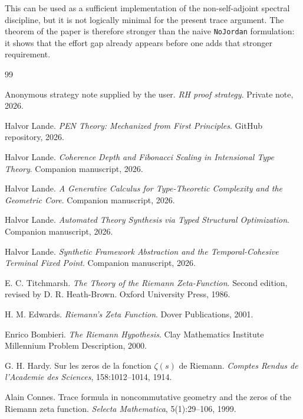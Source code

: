 \documentclass[11pt,a4paper]{article}
\theoremstyle{plain}
\theoremstyle{definition}
\theoremstyle{remark}
\begin{document}
This can be used as a sufficient implementation of the non-self-adjoint spectral discipline, but it is not logically minimal for the present trace argument. The theorem of the paper is therefore stronger than the naive \texttt{NoJordan} formulation: it shows that the effort gap already appears before one adds that stronger requirement.


\begin{thebibliography}{99}

Anonymous strategy note supplied by the user.
\newblock \emph{RH proof strategy}.
\newblock Private note, 2026.

Halvor Lande.
\newblock \emph{PEN Theory: Mechanized from First Principles}.
\newblock GitHub repository, 2026.

Halvor Lande.
\newblock \emph{Coherence Depth and Fibonacci Scaling in Intensional Type Theory}.
\newblock Companion manuscript, 2026.

Halvor Lande.
\newblock \emph{A Generative Calculus for Type-Theoretic Complexity and the Geometric Core}.
\newblock Companion manuscript, 2026.

Halvor Lande.
\newblock \emph{Automated Theory Synthesis via Typed Structural Optimization}.
\newblock Companion manuscript, 2026.

Halvor Lande.
\newblock \emph{Synthetic Framework Abstraction and the Temporal-Cohesive Terminal Fixed Point}.
\newblock Companion manuscript, 2026.

E. C. Titchmarsh.
\newblock \emph{The Theory of the Riemann Zeta-Function}.
\newblock Second edition, revised by D. R. Heath-Brown.
\newblock Oxford University Press, 1986.

H. M. Edwards.
\newblock \emph{Riemann's Zeta Function}.
\newblock Dover Publications, 2001.

Enrico Bombieri.
\newblock \emph{The Riemann Hypothesis}.
\newblock Clay Mathematics Institute Millennium Problem Description, 2000.

G. H. Hardy.
\newblock Sur les zeros de la fonction $\zeta(s)$ de Riemann.
\newblock \emph{Comptes Rendus de l'Academie des Sciences}, 158:1012--1014, 1914.

Alain Connes.
\newblock Trace formula in noncommutative geometry and the zeros of the Riemann zeta function.
\newblock \emph{Selecta Mathematica}, 5(1):29--106, 1999.


\end{thebibliography}
\end{document}
